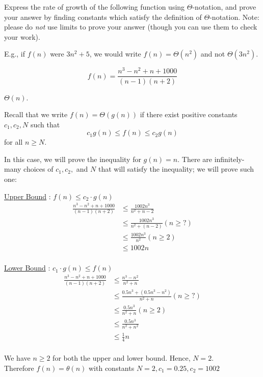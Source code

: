 \begin{prob}
    Express the rate of growth of the following function using $\Theta$-notation, and
    prove your answer by finding constants which satisfy the definition
    of $\Theta$-notation. Note: please do \emph{not} use limits to prove your answer (though
    you can use them to check your work).

    E.g., if $f(n)$ were $3n^2 + 5$, we would write $f(n) = \Theta(n^2)$ and not $\Theta(3n^2)$.

    \[
        f(n) = \frac{n^3 - n^2 + n + 1000}{(n-1)(n+2)}
    \]
    
    \begin{soln}
        $\Theta(n)$.

        Recall that we write $f(n) = \Theta(g(n))$ if there exist positive constants $c_1, c_2, N$
        such that
        \[
            c_1 g(n) \leq f(n) \leq c_2 g(n)
        \]
        for all $n \geq N$.

        In this case, we will prove the inequality for $g(n) = n$. There are infinitely-many choices
        of $c_1, c_2, $ and $N$ that will satisfy the inequality; we will prove such one:

        \underline{Upper Bound} :  $f(n) \leq c_2 \cdot g(n)$ \\

        \begin{align*}
        \frac{n^3-n^2 + n + 1000}{(n-1)(n+2)}
        & \le \frac{1002n^3}{n^2 + n - 2}\\
        & \le \frac{1002n^3}{n^2 + (n - 2)} (n \ge ?) \\
        & \le \frac{1002n^3}{n^2} (n \ge 2) \\
        & \le 1002n \\
        \end{align*}


        \underline{Lower Bound} : $c_1 \cdot g(n) \leq f(n)$ \\

        \begin{align*}
        \frac{n^3-n^2 + n + 1000}{(n-1)(n+2)}
        & \le \frac{n^3-n^2}{n^2 + n}\\
        & \le \frac{0.5n^3 + (0.5n^3 -n^2)}{n^2 + n} (n \ge ?) \\
        & \le \frac{0.5n^3}{n^2 + n} (n \ge 2) \\
        & \le \frac{0.5n^3}{n^2 + n^2} \\
        & \le \frac{1}{4}n \\
        \end{align*}

        We have $n \ge 2 $ for both the upper and lower bound. Hence, $N=2$. \\
        Therefore $f(n) = \theta(n)$ with constants $N=2, c_1 = 0.25, c_2 = 1002$
    \end{soln}
    
\end{prob}
